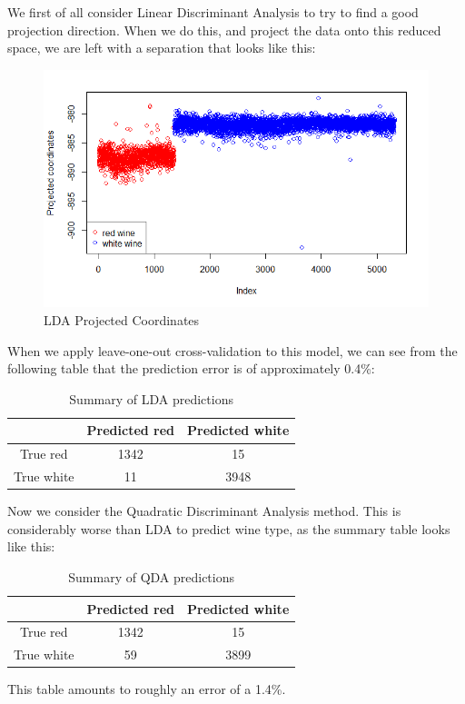\documentclass[10pt]{article}
\begin{document}
We first of all consider Linear Discriminant Analysis to try to find a good projection direction. When we do this, and project the data onto this reduced space, we are left with a separation that looks like this:
\begin{figure}[H]
\centering
\caption{LDA Projected Coordinates}
\includegraphics[scale=0.5]{lda_projection}
\end{figure}
When we apply leave-one-out cross-validation to this model, we can see from the following table that the prediction error is of approximately 0.4\%:
\begin{table}[H]
\caption{Summary of LDA predictions}
\centering
\begin{tabular}{|c|c|c|}
\hline
 & Predicted red & Predicted white \\ \hline
True red & 1342 & 15 \\ \hline
True white & 11 & 3948 \\ \hline
\end{tabular}
\end{table}
Now we consider the Quadratic Discriminant Analysis method. This is considerably worse than LDA to predict wine type, as the summary table looks like this:
\begin{table}[H]
\caption{Summary of QDA predictions}
\centering
\begin{tabular}{|c|c|c|}
\hline
 & Predicted red & Predicted white \\ \hline
True red & 1342 & 15 \\ \hline
True white & 59 & 3899 \\ \hline
\end{tabular}
\end{table}
This table amounts to roughly an error of a 1.4\%.\\
\end{document}
